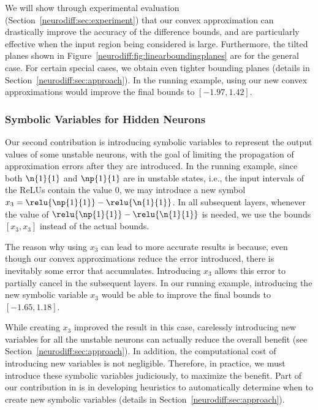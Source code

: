 We will show through experimental evaluation
(Section~\ref{neurodiff:sec:experiment}) that our convex approximation can
drastically improve the accuracy of the difference bounds, and are
particularly effective when the input region being considered is
large.  Furthermore, the tilted planes shown in
Figure~\ref{neurodiff:fig:linearboundingplanes} are for the general case.  For
certain special cases, we obtain even tighter bounding planes (details
in Section~\ref{neurodiff:sec:approach}).
%
In the running example, using our new convex approximations would
improve the final bounds to $ [-1.97, 1.42] $.


\subsubsection{Symbolic Variables for Hidden Neurons}

Our second contribution is introducing symbolic variables to represent
the output values of some unstable neurons, with the goal of limiting
the propagation of approximation errors after they are introduced.
%
In the running example, since both $ \n{1}{1} $ and $ \np{1}{1} $ are in unstable states,
i.e., the input intervals of the ReLUs contain the value 0, we may introduce a
new
symbol $ x_3 = \relu{\np{1}{1}} - \relu{\n{1}{1}} $.  In all
subsequent layers, whenever the value of $\relu{\np{1}{1}}
- \relu{\n{1}{1}}$ is needed, we use the bounds $[x_3,x_3]$ instead of
the actual bounds.


The reason why using $x_3$ can lead to more accurate results is
because, even though our convex approximations reduce the error
introduced, there is inevitably some error that accumulates. Introducing $
x_3 $ allows this error to partially cancel in the subsequent
layers. In our running example, introducing the new symbolic variable
$x_3$ would be able to improve the final bounds to $ [-1.65, 1.18] $.


While creating $ x_3 $ improved the result
in this case, carelessly introducing new variables for all the unstable
neurons can actually reduce the overall benefit (see
Section~\ref{neurodiff:sec:approach}). In addition, the
computational cost of introducing new variables is not negligible.
Therefore, in practice, we must introduce
these symbolic variables judiciously, to maximize the benefit.
%
Part of our contribution in \Name{} is in developing heuristics to
automatically determine when to create new symbolic variables (details
in Section~\ref{neurodiff:sec:approach}).



